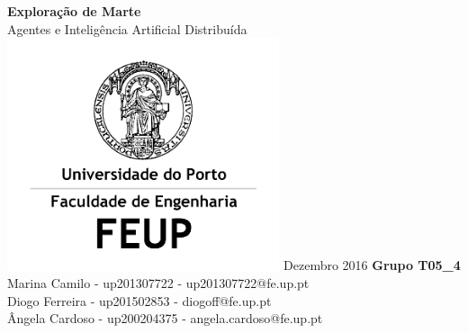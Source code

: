 \documentclass[12pt]{report}
\begin{document}
\newcommand{\sajas}{\texttt{SAJaS}\xspace}
\newcommand{\jade}{\texttt{JADE}\xspace}
\newcommand{\repast}{\texttt{Repast 3}\xspace}
\newcommand{\massim}{\texttt{MASSim2Dev}\xspace}
\newcommand{\java}{\texttt{JAVA}\xspace}
\newcommand{\acl}{\texttt{ACL}\xspace}
\newcommand{\fipa}{\texttt{FIPA}\xspace}
\newcommand{\spotter}{\emph{spotter}\xspace}
\newcommand{\Spotter}{\emph{Spotter}\xspace}
\newcommand{\spotters}{\emph{spotters}\xspace}
\newcommand{\Spotters}{\emph{Spotters}\xspace}
\newcommand{\Producer}{\emph{Producer}\xspace}
\newcommand{\producer}{\emph{producer}\xspace}
\newcommand{\producers}{\emph{producers}\xspace}
\newcommand{\Producers}{\emph{Producers}\xspace}
\newcommand{\Transporter}{\emph{Transporter}\xspace}
\newcommand{\transporter}{\emph{transporter}\xspace}
\newcommand{\transporters}{\emph{transporters}\xspace}
\newcommand{\Transporters}{\emph{Transporters}\xspace}
\newcommand{\size}{\emph{size}\xspace}
\newcommand{\minerals}{\emph{minerals}\xspace}

\begin{titlepage}
	\begin{center}
		\vspace*{1cm}
        \Huge
        \textbf{Exploração de Marte}
        \vspace{0.5cm} \ \\
        \LARGE
        Agentes e Inteligência Artificial Distribuída
        \vfill
		\includegraphics[width=0.6\textwidth]{FEUP_Logo}
		\break
        \small
        Dezembro 2016
        \vfill
		\vspace{1.5cm}
        \normalsize{
		\textbf{Grupo T05\_4} \\
		Marina Camilo - up201307722 - up201307722@fe.up.pt \\
		Diogo Ferreira - up201502853 - diogoff@fe.up.pt \\
		Ângela Cardoso - up200204375 - angela.cardoso@fe.up.pt
        }
	\end{center}
\end{titlepage}
\end{document}
